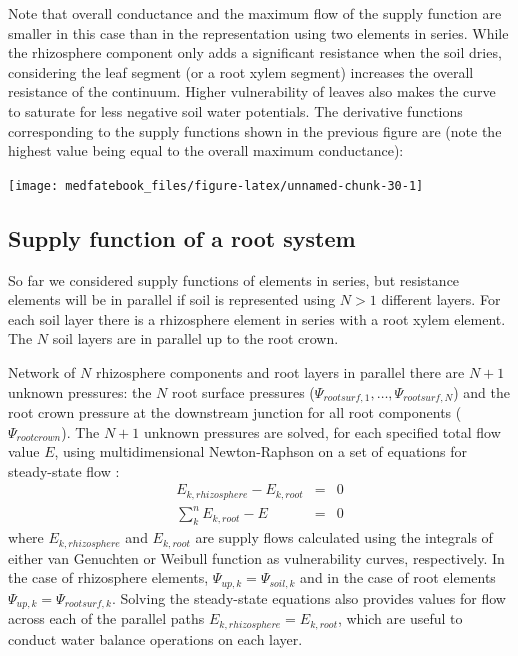 \documentclass[]{book}
\begin{document}
Note that overall conductance and the maximum flow of the supply function are smaller in this case than in the representation using two elements in series. While the rhizosphere component only adds a significant resistance when the soil dries, considering the leaf segment (or a root xylem segment) increases the overall resistance of the continuum. Higher vulnerability of leaves also makes the curve to saturate for less negative soil water potentials. The derivative functions corresponding to the supply functions shown in the previous figure are (note the highest value being equal to the overall maximum conductance):

\begin{center}\texttt{[image: medfatebook\_files/figure-latex/unnamed-chunk-30-1]} \end{center}

\hypertarget{supply-function-of-a-root-system}{%
\subsection{Supply function of a root system}\label{supply-function-of-a-root-system}}

So far we considered supply functions of elements in series, but resistance elements will be in parallel if soil is represented using \(N>1\) different layers. For each soil layer there is a rhizosphere element in series with a root xylem element. The \(N\) soil layers are in parallel up to the root crown.

Network of \(N\) rhizosphere components and root layers in parallel there are \(N+1\) unknown pressures: the \(N\) root surface pressures (\(\Psi_{rootsurf,1},\dots,\Psi_{rootsurf,N}\)) and the root crown pressure at the downstream junction for all root components (\(\Psi_{rootcrown}\)). The \(N+1\) unknown pressures are solved, for each specified total flow value \(E\), using multidimensional Newton-Raphson on a set of equations for steady-state flow \citep{Sperry2016a}:
\begin{eqnarray}
   E_{k, rhizosphere}-E_{k,root} &=& 0 \\
   \sum_{k}^{n}{E_{k,root}}-E &=& 0
\end{eqnarray}
where \(E_{k, rhizosphere}\) and \(E_{k, root}\) are supply flows calculated using the integrals of either van Genuchten or Weibull function as vulnerability curves, respectively. In the case of rhizosphere elements, \(\Psi_{up,k}=\Psi_{soil,k}\) and in the case of root elements \(\Psi_{up,k}=\Psi_{rootsurf,k}\). Solving the steady-state equations also provides values for flow across each of the parallel paths \(E_{k, rhizosphere} = E_{k, root}\), which are useful to conduct water balance operations on each layer.
\end{document}

